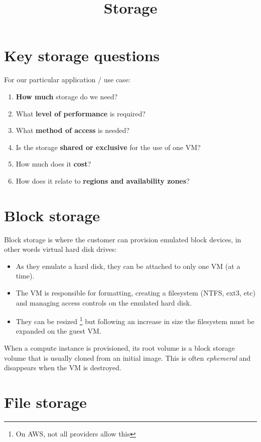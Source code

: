 \documentclass{pgnotes}
\title{Storage}
\begin{document}
\maketitle

\section{Key storage questions}

For our particular application / use case: 
\begin{enumerate}
\item \textbf{How much} storage do we need?
\item What \textbf{level of performance} is required? 
\item What \textbf{method of access} is needed?
\item Is the storage \textbf{shared or exclusive} for the use of one VM?
\item How much does it \textbf{cost}?
\item How does it relate to \textbf{regions and availability zones}? 
\end{enumerate}

\section{Block storage}

Block storage is where the customer can provision emulated block devices, in other words virtual hard disk drives:
\begin{itemize}
\item As they emulate a hard disk, they can be attached to only one VM (at a time).
\item The VM is responsible for formatting, creating a filesystem (NTFS, ext3, etc) and managing access controls  on the emulated hard disk.
\item They can be resized \footnote{On AWS, not all providers allow this} but following an increase in size the filesystem must be expanded on the guest VM. 
\end{itemize}
When a compute instance is provisioned, its root volume is a block storage volume that is usually cloned from an initial image. This is often \textit{ephemeral} and disappears when the VM is destroyed.

\section{File storage}
\end{document}
